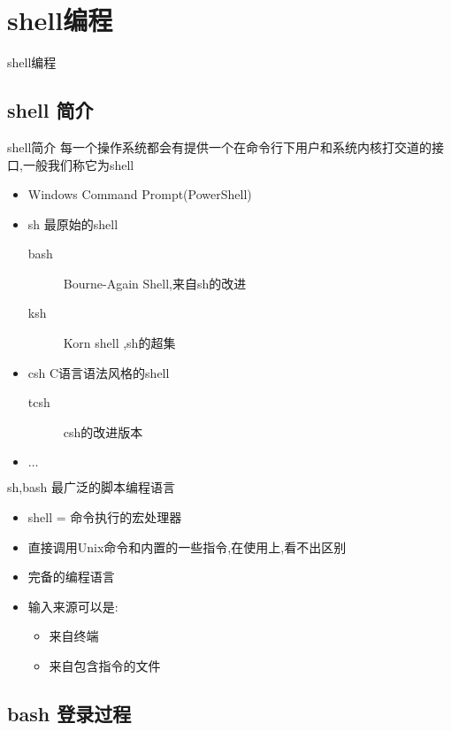 \section{shell编程}

\begin{frame}{shell编程}
	\tableofcontents[currentsection]
\end{frame}

\subsection{shell 简介}
\begin{frame}{shell简介}
每一个操作系统都会有提供一个在命令行下用户和系统内核打交道的接口,一般我们称它为shell
\begin{itemize}
\item Windows Command Prompt(PowerShell)
\item sh 最原始的shell
	\begin{description}
	\item[bash] Bourne-Again Shell,来自sh的改进
	\item[ksh] Korn shell ,sh的超集
	\end{description}
\item csh C语言语法风格的shell
	\begin{description}
	\item[tcsh] csh的改进版本
	\end{description}
\item $\ldots$
\end{itemize}
\end{frame}

\begin{frame}{sh,bash 最广泛的脚本编程语言}
\begin{itemize}
\item shell = 命令执行的宏处理器
\item 直接调用Unix命令和内置的一些指令,在使用上,看不出区别
\item 完备的编程语言
\item 输入来源可以是:
	\begin{itemize}
	\item 来自终端
	\item 来自包含指令的文件
	\end{itemize}
\end{itemize}
\end{frame}

\subsection{bash 登录过程}

